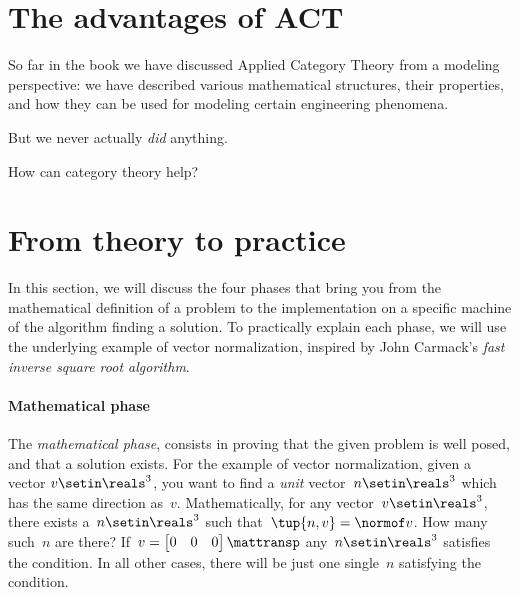 
\section{The advantages of ACT}

So far in the book we have discussed Applied Category Theory from a modeling perspective: we have described various mathematical structures, their properties, and how they can be used for modeling certain engineering phenomena.

But we never actually \emph{did} anything.

How can category theory help?


\section{From theory to practice}
In this section, we will discuss the four phases that bring you from the mathematical definition of a problem to the implementation on a specific machine of the algorithm finding a solution.
To practically explain each phase, we will use the underlying example of vector normalization, inspired by John Carmack's \emph{fast inverse square root algorithm}.


\paragraph*{Mathematical phase}
The \emph{mathematical phase}, consists in proving that the given problem is well posed, and that a solution exists.
For the example of vector normalization, given a vector $v\setin \reals^3$, you want to find a \emph{unit} vector~$n\setin \reals^3$ which has the same direction as~$v$.
Mathematically, for any vector~$v\setin \reals^3$, there exists a~$n\setin \reals^3$ such that~$\tup{n,v}=\normof v $.
How many such~$n$ are there?
If~$v=\begin{bmatrix}
        0 & 0 & 0
    \end{bmatrix}\mattransp$ any~$n\setin \reals^3$ satisfies the condition.
In all other cases, there will be just one single~$n$ satisfying the condition.

